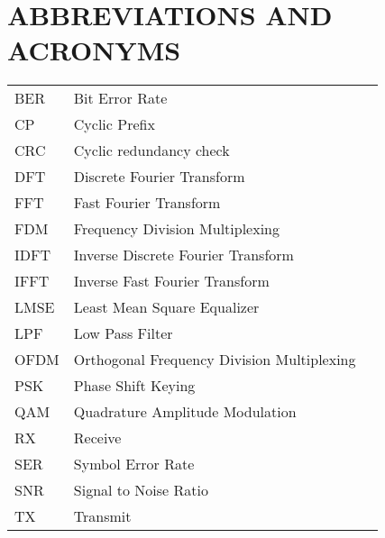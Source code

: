 \section*{ABBREVIATIONS AND ACRONYMS}
 {}

\begin{tabularx}{0.9\textwidth}{ L{0.4} L{1.3} L{1.3} }
    BER     & Bit Error Rate \\ %
    CP      & Cyclic Prefix \\
    CRC     & Cyclic redundancy check \\
    DFT     & Discrete Fourier Transform \\
    FFT     & Fast Fourier Transform \\
    FDM     & Frequency Division Multiplexing \\
    IDFT    & Inverse Discrete Fourier Transform \\
    IFFT    & Inverse Fast Fourier Transform \\
    LMSE    & Least Mean Square Equalizer \\ %
    LPF     & Low Pass Filter \\
    OFDM    & Orthogonal Frequency Division Multiplexing \\ %
    PSK     & Phase Shift Keying \\ %
    QAM     & Quadrature Amplitude Modulation \\ %
    RX      & Receive \\
    SER     & Symbol Error Rate \\ %
    SNR     & Signal to Noise Ratio \\ %
    TX      & Transmit \\
\end{tabularx}

\newpage